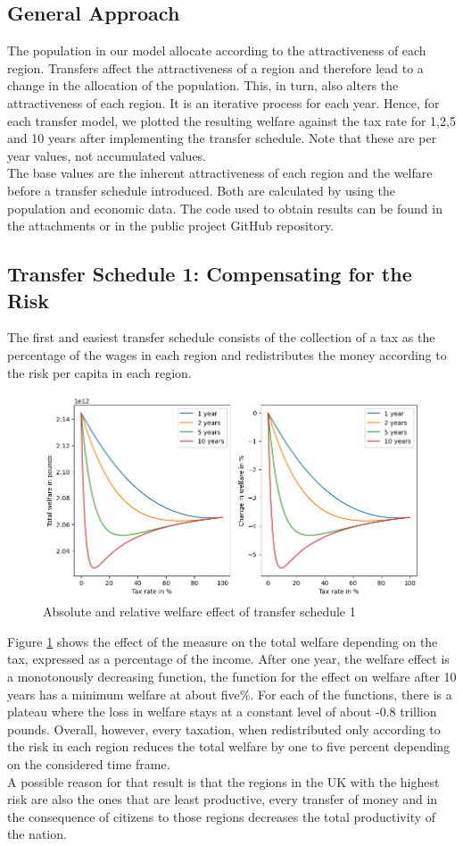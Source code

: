 \documentclass[10pt,a4paper]{article}
\begin{document}
\subsection{General Approach}
The population in our model allocate according to the attractiveness of each region. Transfers affect the attractiveness of a region and therefore lead to a change in the allocation of the population. This, in turn, also alters the attractiveness of each region. It is an iterative process for each year. Hence, for each transfer model, we plotted the resulting welfare against the tax rate for 1,2,5 and 10 years after implementing the transfer schedule. Note that these are per year values, not accumulated values.
\\
The base values are the inherent attractiveness of each region and the welfare before a transfer schedule introduced. Both are calculated by using the population and economic data. The code used to obtain results can be found in the attachments or in the public project GitHub repository\cite{art2022nick4rt}.
\subsection{Transfer Schedule 1: Compensating for the Risk}
The first and easiest transfer schedule consists of the collection of a tax as the percentage of the wages in each region and redistributes the money according to the risk per capita in each region.
\begin{figure}[H]
    \centering
    \includegraphics[width=\textwidth]{Report/Schedule_1_graphics.png}
    \caption{Absolute and relative welfare effect of transfer schedule 1}
    \label{fig:sche1}
\end{figure}
Figure \ref{fig:sche1} shows the effect of the measure on the total welfare depending on the tax, expressed as a percentage of the income. After one year, the welfare effect is a monotonously decreasing function, the function for the effect on welfare after 10 years has a minimum welfare at about five\%. For each of the functions, there is a plateau where the loss in welfare stays at a constant level of about -0.8 trillion pounds. Overall, however, every taxation, when redistributed only according to the risk in each region reduces the total welfare by one to five percent depending on the considered time frame. 
\\
A possible reason for that result is that the regions in the UK with the highest risk are also the ones that are least productive, every transfer of money and in the consequence of citizens to those regions decreases the total productivity of the nation.
\end{document}
